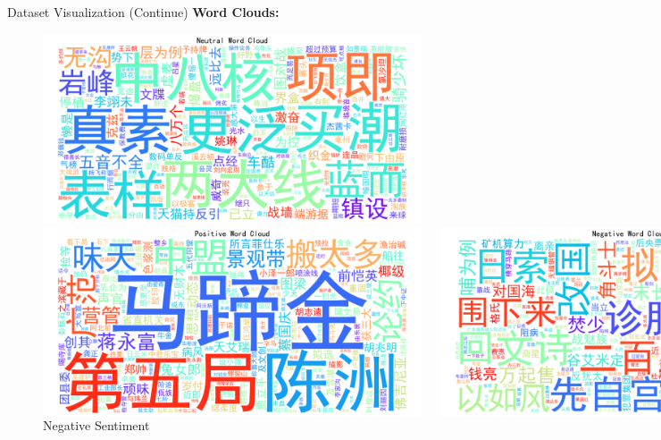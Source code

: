 \documentclass[aspectratio=169]{beamer}
\begin{document}
\begin{frame}{Dataset Visualization (Continue)}
  \textbf{Word Clouds:}
  \begin{figure}
    \centering
    \includegraphics[width=0.33\linewidth]{wordcloud_neutral.png}
    \caption{\small Neutral Sentiment}
    \vspace{1em}

    \begin{columns}[c]
      \centering
      \includegraphics[width=0.63\linewidth]{wordcloud_positive.png}
      \caption{\small Positive Sentiment}

      \centering
      \includegraphics[width=0.63\linewidth]{wordcloud_negative.png}
      \caption{\small Negative Sentiment}
    \end{columns}
  \end{figure}
\end{frame}
  
\end{document}
